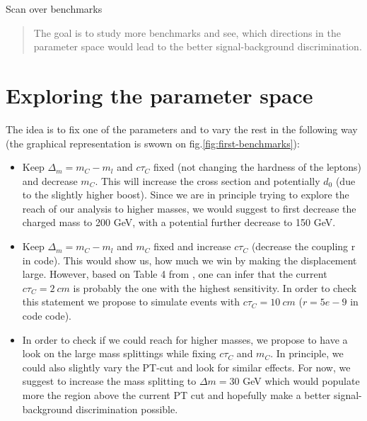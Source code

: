 \documentclass[12pt,letterpaper,notitlepage]{article}
\begin{document}
\begin{center}
\LARGE Scan over benchmarks
\end{center}

\vspace{1.0cm}
\begin{abstract}
\vspace{0.2cm}\noindent
The goal is to study more benchmarks and see, which directions in the parameter space would lead to the better signal-background discrimination.
\end{abstract}

\section{Exploring the parameter space}
The idea is to fix one of the parameters and to vary the rest in the following way (the graphical representation is swown on fig.\ref{fig:first-benchmarks}):
\begin{itemize}
  \item Keep $\Delta_m=m_C-m_l$ and $c \tau_C$ fixed (not changing the hardness of the leptons) and decrease $m_C$. This will increase the cross section and potentially $d_0$ (due to the slightly higher boost). Since we are in principle trying to explore the reach of our analysis to higher masses, we would suggest to first decrease the charged mass to 200 GeV, with a potential further decrease to 150 GeV.
  \item Keep $\Delta_m=m_C-m_l$ and $m_C$ fixed and increase  $c \tau_C$ (decrease the coupling r in code). This would show us, how much we win by making the displacement large. However, based on Table 4 from \cite{CMS:2016isf}, one can infer that the current $c \tau_C=2\ cm$ is probably the one with the highest sensitivity. In order to check this statement we propose to simulate events with $c \tau_C=10\ cm$ ($r=5e-9$ in code code).
  \item In order to check if we could reach for higher masses, we propose to have a look on the large mass splittings while fixing $c \tau_C$ and $m_C$. In principle, we could also slightly vary the PT-cut and look for similar effects. For now, we suggest to increase the mass splitting to $\Delta m=30$ GeV which would populate more the region above the current PT cut and hopefully make a better signal-background discrimination possible.
\end{itemize}
\end{document}
